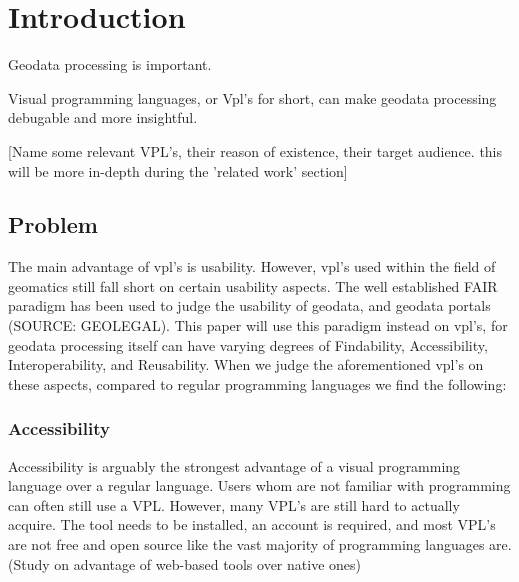 \section{Introduction}

\par
Geodata processing is important.

\par
Visual programming languages, or Vpl's for short, can make geodata processing debugable and more insightful. 

[Name some relevant VPL's, their reason of existence, their target audience.
this will be more in-depth during the 'related work' section] 


\subsection{Problem}
The main advantage of vpl's is usability. 
However, vpl's used within the field of geomatics still fall short on certain usability aspects. 
The well established FAIR paradigm has been used to judge the usability of geodata, and geodata portals (SOURCE: GEOLEGAL). 
This paper will use this paradigm instead on vpl's, for geodata processing itself can have varying degrees of Findability, Accessibility, Interoperability, and Reusability. 
When we judge the aforementioned vpl's on these aspects, compared to regular programming languages we find the following: 


\subsubsection*{Accessibility}
Accessibility is arguably the strongest advantage of a visual programming language over a regular language. 
Users whom are not familiar with programming can often still use a VPL. 
However, many VPL's are still hard to actually acquire. 
The tool needs to be installed, an account is required, and most VPL's are not free and open source like the vast majority of programming languages are. (Study on advantage of web-based tools over native ones)

